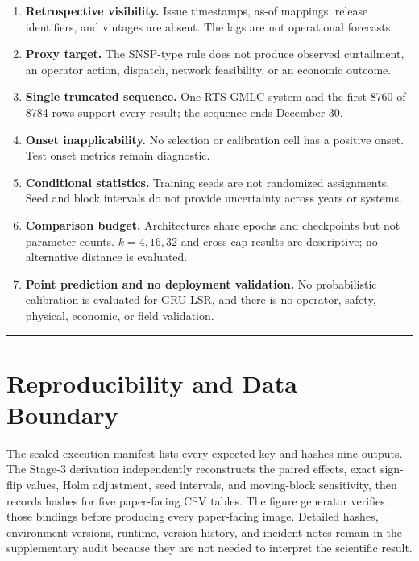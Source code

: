\documentclass{ieeeaccess}
\providecommand{\tightlist}{\setlength{\itemsep}{0pt}\setlength{\parskip}{0pt}}
\begin{document}
\begin{enumerate}
\def\labelenumi{\arabic{enumi}.}
\tightlist
\item
  \textbf{Retrospective visibility.} Issue timestamps, as-of mappings, release identifiers, and vintages are absent. The lags are not operational forecasts.
\item
  \textbf{Proxy target.} The SNSP-type rule does not produce observed curtailment, an operator action, dispatch, network feasibility, or an economic outcome.
\item
  \textbf{Single truncated sequence.} One RTS-GMLC system and the first 8760 of 8784 rows support every result; the sequence ends December 30.
\item
  \textbf{Onset inapplicability.} No selection or calibration cell has a positive onset. Test onset metrics remain diagnostic.
\item
  \textbf{Conditional statistics.} Training seeds are not randomized assignments. Seed and block intervals do not provide uncertainty across years or systems.
\item
  \textbf{Comparison budget.} Architectures share epochs and checkpoints but not parameter counts. \(k=4,16,32\) and cross-cap results are descriptive; no alternative distance is evaluated.
\item
  \textbf{Point prediction and no deployment validation.} No probabilistic calibration is evaluated for GRU-LSR, and there is no operator, safety, physical, economic, or field validation.
\end{enumerate}

\begin{center}\rule{0.5\linewidth}{0.5pt}\end{center}

\section{Reproducibility and Data Boundary}\label{reproducibility-and-data-boundary}

The sealed execution manifest lists every expected key and hashes nine outputs. The Stage-3 derivation independently reconstructs the paired effects, exact sign-flip values, Holm adjustment, seed intervals, and moving-block sensitivity, then records hashes for five paper-facing CSV tables. The figure generator verifies those bindings before producing every paper-facing image. Detailed hashes, environment versions, runtime, version history, and incident notes remain in the supplementary audit because they are not needed to interpret the scientific result.
\end{document}
